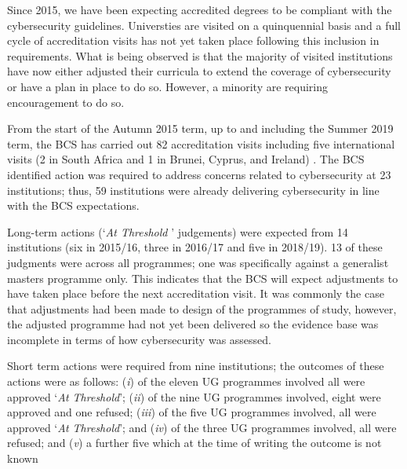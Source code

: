 \documentclass[a4paper,11pt]{article}
\begin{document}
Since 2015, we have been expecting accredited degrees to be compliant with the cybersecurity guidelines. Universties are visited on a quinquennial basis and a full cycle of accreditation visits has not yet taken place following this inclusion in requirements. What is being observed is that the majority of visited institutions have now either adjusted their curricula to extend the coverage of cybersecurity or have a plan in place to do so. However, a minority are requiring encouragement to do so.

From the start of the Autumn 2015 term, up to and including the Summer 2019 term, the BCS has carried out 82 accreditation visits including five international visits (2 in South Africa and 1 in Brunei, Cyprus, and Ireland) . The BCS identified action was required to address concerns related to cybersecurity at 23 institutions; thus, 59 institutions were already delivering cybersecurity in line with the BCS expectations.

Long-term actions (`{\emph{At Threshold }}' judgements) were expected from 14 institutions (six in 2015/16, three in 2016/17 and five in 2018/19). 13 of these judgments were across all programmes; one was specifically against a generalist masters programme only. This indicates that the BCS will expect adjustments to have taken place before the next accreditation visit. It was commonly the case that adjustments had been made to design of the programmes of study, however, the adjusted programme had not yet been delivered so the evidence base was incomplete in terms of how cybersecurity was assessed.
 
Short term actions were required from nine institutions; the outcomes of these actions were as follows: ({\emph{i}}) of the eleven UG programmes involved all were approved `{\emph{At Threshold}}'; ({\emph{ii}}) of the nine UG programmes involved, eight were approved and one refused; ({\emph{iii}}) of the five UG programmes involved, all were approved `{\emph{At Threshold}}'; and ({\emph{iv}}) of the three UG programmes involved, all were refused; and ({\emph{v}}) a further five which at the time of writing the outcome is not known

 
\end{document}
